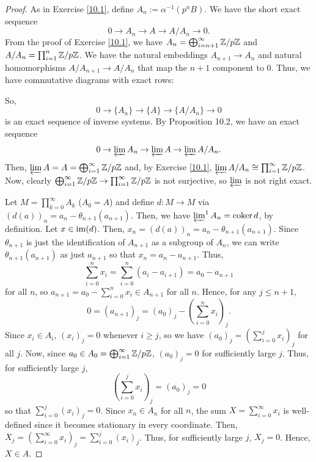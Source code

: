 \begin{proof}
As in Exercise \ref{10.1}, define $A_n := \alpha^{-1}(p^n B)$. We have the short exact sequence
$$0 \to A_n \to A \to A/A_n \to 0.$$
From the proof of Exercise \ref{10.1}, we have $A_n = \bigoplus_{i=n+1}^{\infty} \mathbb{Z}/p\mathbb{Z}$ 
and $A/A_n = \prod_{i=1}^n \mathbb{Z}/p\mathbb{Z}$. We have the natural embeddings $A_{n+1} \to A_n$ 
and natural homomorphisms $A/A_{n+1} \to A/A_n$ that map the $n+1$ component to $0$. Thus, we have commutative 
diagrams with exact rows:
\begin{center}
\end{center}
So, 
$$0 \to \{A_n\} \to \{A\} \to \{A/A_n\} \to 0$$
is an exact sequence of inverse systems. By Proposition 10.2, we have an exact sequence
$$0 \to \varprojlim A_n \to \varprojlim A \to \varprojlim A/A_n.$$
Then, $\varprojlim A = A = \bigoplus_{i=1}^{\infty}\mathbb{Z}/p\mathbb{Z}$ and, by Exercise \ref{10.1}, $\varprojlim A/A_n \cong \prod_{i=1}^{\infty}\mathbb{Z}/p\mathbb{Z}$.
Now, clearly $\bigoplus_{i=1}^{\infty}\mathbb{Z}/p\mathbb{Z} \to \prod_{i=1}^{\infty}\mathbb{Z}/p\mathbb{Z}$ is not surjective, so $\varprojlim$ is not right exact.

Let $M = \prod_{k=0}^{\infty} A_k$ ($A_0 = A$) and define $d : M \to M$ via $(d(a))_n = a_n - \theta_{n+1}(a_{n+1})$. Then, we have 
$\varprojlim^1 A_n = \operatorname{coker} d$, by definition. Let $x \in \operatorname{im}(d)$. Then, $x_n = (d(a))_n = a_n - \theta_{n+1}(a_{n+1})$. Since $\theta_{n+1}$ 
is just the identification of $A_{n+1}$ as a subgroup of $A_n$, we can write $\theta_{n+1}(a_{n+1})$ as just $a_{n+1}$ so that $x_n = a_n - a_{n+1}$. 
Thus, $$\sum_{i=0}^n x_i = \sum_{i=0}^n (a_i - a_{i+1}) = a_0 - a_{n+1}$$
for all $n$, so $a_{n+1} = a_0 - \sum_{i=0}^n x_i \in A_{n+1}$ for all $n$. Hence, for any $j \le n+1$, 
$$0 = (a_{n+1})_j = (a_0)_j - \left(\sum_{i=0}^n x_i\right)_j.$$
Since $x_i \in A_i$, $(x_i)_j = 0$ whenever $i \ge j$, so we have $(a_0)_j = \left(\sum_{i=0}^j x_i\right)_j$ for all $j$. 
Now, since $a_0 \in A_0 = \bigoplus_{i=1}^{\infty} \mathbb{Z}/p\mathbb{Z}$, $(a_0)_j = 0$ for sufficiently large $j$. Thus, for sufficiently large $j$,
$$\left(\sum_{i=0}^j x_i\right)_j = (a_0)_j = 0$$
so that $\sum_{i=0}^j (x_i)_j = 0$. Since $x_n \in A_n$ for all $n$, the sum $X = \sum_{i=0}^{\infty} x_i$ is well-defined since it becomes 
stationary in every coordinate. Then, $X_j = \left(\sum_{i=0}^{\infty} x_i\right)_j = \sum_{i=0}^j (x_i)_j$. Thus, for sufficiently large $j$, 
$X_j = 0$. Hence, $X \in A$.


\end{proof}

